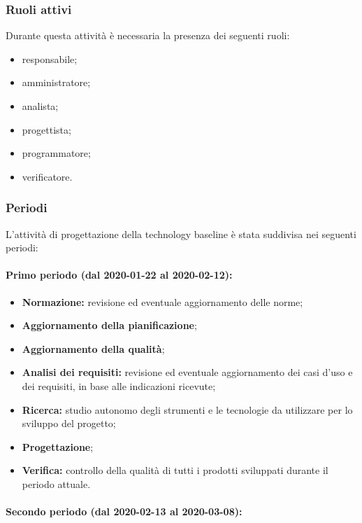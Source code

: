 			\subsubsection{Ruoli attivi}
			
				Durante questa attività è necessaria la presenza dei seguenti ruoli:
				\begin{itemize}
					\item responsabile;
					\item amministratore;
					\item analista;
					\item progettista;
					\item programmatore;
					\item verificatore.
				\end{itemize}
			
			\subsubsection{Periodi}
			
				L'attività di progettazione della technology baseline è stata suddivisa nei seguenti periodi:
				
				\paragraph{Primo periodo (dal 2020-01-22 al 2020-02-12):}
				
					\begin{itemize}
					 	\item \textbf{Normazione:} revisione ed eventuale aggiornamento delle norme;
					 	\item \textbf{Aggiornamento della pianificazione};
					 	\item \textbf{Aggiornamento della qualità};
					 	\item \textbf{Analisi dei requisiti:} revisione ed eventuale aggiornamento dei casi d'uso e dei requisiti, in base alle indicazioni ricevute;
					 	\item \textbf{Ricerca:} studio autonomo degli strumenti e le tecnologie da utilizzare per lo sviluppo del progetto;
					 	\item \textbf{Progettazione};
					 	\item \textbf{Verifica:} controllo della qualità di tutti i prodotti sviluppati durante il periodo attuale.
					\end{itemize} 	
				
				\paragraph{Secondo periodo (dal 2020-02-13 al 2020-03-08):}
				
